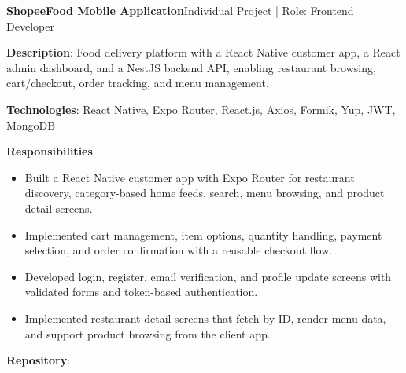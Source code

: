   \resumeProjectHeading
    {\textbf{ShopeeFood Mobile Application}}{Individual Project | Role: Frontend Developer}
    \resumeItemListStart
      \item \textbf{Description}: Food delivery platform with a React Native customer app, a React admin dashboard,
        and a NestJS backend API, enabling restaurant browsing, cart/checkout, order tracking, and menu management.
      \item \textbf{Technologies}: React Native, Expo Router, React.js, Axios, Formik, Yup, JWT, MongoDB
      \item \textbf{Responsibilities}
        \begin{itemize}
          \item Built a React Native customer app with Expo Router for restaurant discovery, category-based home feeds, search, menu browsing, and product detail screens.
          \item Implemented cart management, item options, quantity handling, payment selection, and order confirmation with a reusable checkout flow.
          \item Developed login, register, email verification, and profile update screens with validated forms and token-based authentication.
          \item Implemented restaurant detail screens that fetch by ID, render menu data, and support product browsing from the client app.
        \end{itemize}
      \item \textbf{Repository}: \href{https://github.com/nvminh162/shopeefood-app}{}
    \resumeItemListEnd

